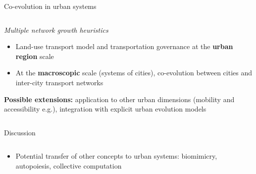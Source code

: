 \documentclass{beamer}
\begin{document}
\begin{frame}{}
\begin{columns}[t]
\begin{column}{.49\textwidth}
\begin{block}{Co-evolution in urban systems}
\begin{columns}[t]
\begin{column}{.95\textwidth}
\begin{center}
       {\small \textit{Multiple network growth heuristics \cite{raimbault2018multi}}}
       
		\end{center}

        \vspace{1cm}
        
        \begin{itemize}
        	\item Land-use transport model and transportation governance at the \textbf{urban region} scale \cite{raimbault2021introducing}	
        \end{itemize}
        
        \vspace{1cm}
        
        \begin{itemize}
        	\item At the \textbf{macroscopic} scale (systems of cities), co-evolution between cities and inter-city transport networks \cite{raimbault2021modeling}
        \end{itemize}

       
       \vspace{1cm}
       
       \textbf{Possible extensions:} application to other urban dimensions (mobility and accessibility e.g.), integration with explicit urban evolution models
      
       
         
         
        
        
                  \end{column}
          \end{columns}
        \end{block}
      
      
      
        \begin{block}{Discussion}
         \begin{columns}[t]
        \begin{column}{.95\textwidth}

		\vspace{-1.5cm}

		\begin{itemize}
			\item \justify Potential transfer of other concepts to urban systems: biomimicry, autopoiesis, collective computation
		\end{itemize}
		

\end{column}
\end{columns}
\end{block}
\end{column}
\end{columns}
\end{frame}
\end{document}
